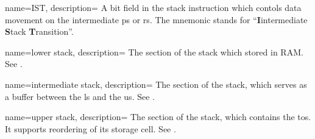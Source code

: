  {
    name={IST},
    description={
      A bit field in the stack instruction which contols data movement
      on the intermediate \gls{ps} or \gls{rs}.
      The mnemonic stands for
      ``\textbf{I}intermediate \textbf{S}tack \textbf{T}ransition''.
      \nopostdesc
    }
}

 {
    name={lower stack},
    description={
      The section of the stack which stored in RAM.
      See . 
      \nopostdesc
    }
}

 {
    name={intermediate stack},
    description={
      The section of the stack, which serves as a buffer between the
      \gls{ls} and the \gls{us}.
      See . 
      \nopostdesc
    }
}

 {
    name={upper stack},
    description={
      The section of the stack, which contains the \gls{tos}. It supports
      reordering of its storage \gls{cell}.
      See . 
      \nopostdesc
    }
}
